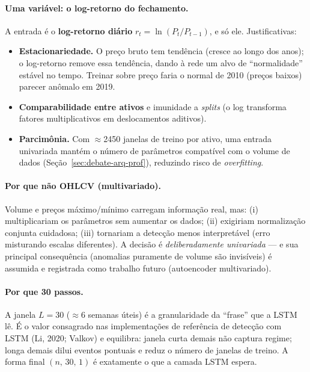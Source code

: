 \paragraph{Uma variável: o log-retorno do fechamento.}
A entrada é o \textbf{log-retorno diário} $r_t = \ln(P_t/P_{t-1})$, e só ele.
Justificativas:
\begin{itemize}[noitemsep]
  \item \textbf{Estacionariedade.} O preço bruto tem tendência (cresce ao longo
        dos anos); o log-retorno remove essa tendência, dando à rede um alvo de
        ``normalidade'' estável no tempo. Treinar sobre preço faria o normal de
        2010 (preços baixos) parecer anômalo em 2019.
  \item \textbf{Comparabilidade entre ativos} e imunidade a \emph{splits}
        (o log transforma fatores multiplicativos em deslocamentos aditivos).
  \item \textbf{Parcimônia.} Com $\approx$2450 janelas de treino por ativo, uma
        entrada univariada mantém o número de parâmetros compatível com o volume
        de dados (Seção~\ref{sec:debate-arq-prof}), reduzindo risco de
        \emph{overfitting}.
\end{itemize}

\paragraph{Por que não OHLCV (multivariado).}
Volume e preços máximo/mínimo carregam informação real, mas: (i) multiplicariam
os parâmetros sem aumentar os dados; (ii) exigiriam normalização conjunta
cuidadosa; (iii) tornariam a detecção menos interpretável (erro misturando
escalas diferentes). A decisão é \emph{deliberadamente univariada} --- e sua
principal consequência (anomalias puramente de volume são invisíveis) é assumida
e registrada como trabalho futuro (autoencoder multivariado).

\paragraph{Por que 30 passos.}
A janela $L=30$ ($\approx$6 semanas úteis) é a granularidade da ``frase'' que a
LSTM lê. É o valor consagrado nas implementações de referência de detecção com
LSTM (Li, 2020; Valkov) e equilibra: janela curta demais não captura regime;
longa demais dilui eventos pontuais e reduz o número de janelas de treino. A
forma final $(n,\,30,\,1)$ é exatamente o que a camada LSTM espera.

